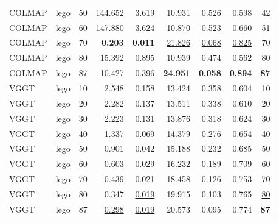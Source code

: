 \begin{table}[H]
\begin{tabular}{llrrrrrrr}
COLMAP & lego & 50 & 144.652 & 3.619 & 10.931 & 0.526 & 0.598 & 42 \\
COLMAP & lego & 60 & 147.880 & 3.624 & 10.870 & 0.523 & 0.660 & 51 \\
COLMAP & lego & 70 & \textbf{0.203} & \textbf{0.011} & \underline{21.826} & \underline{0.068} & \underline{0.825} & 70 \\
COLMAP & lego & 80 & 15.392 & 0.895 & 10.939 & 0.474 & 0.562 & \underline{80} \\
COLMAP & lego & 87 & 10.427 & 0.396 & \textbf{24.951} & \textbf{0.058} & \textbf{0.894} & \textbf{87} \\
VGGT & lego & 10 & 2.548 & 0.158 & 13.424 & 0.358 & 0.604 & 10 \\
VGGT & lego & 20 & 2.282 & 0.137 & 13.511 & 0.338 & 0.610 & 20 \\
VGGT & lego & 30 & 2.223 & 0.131 & 13.876 & 0.318 & 0.624 & 30 \\
VGGT & lego & 40 & 1.337 & 0.069 & 14.379 & 0.276 & 0.654 & 40 \\
VGGT & lego & 50 & 0.901 & 0.042 & 15.188 & 0.232 & 0.685 & 50 \\
VGGT & lego & 60 & 0.603 & 0.029 & 16.232 & 0.189 & 0.709 & 60 \\
VGGT & lego & 70 & 0.439 & 0.021 & 18.458 & 0.126 & 0.753 & 70 \\
VGGT & lego & 80 & 0.347 & \underline{0.019} & 19.915 & 0.103 & 0.765 & \underline{80} \\
VGGT & lego & 87 & \underline{0.298} & \underline{0.019} & 20.573 & 0.095 & 0.774 & \textbf{87} \\
\bottomrule
\end{tabular}
\end{table}